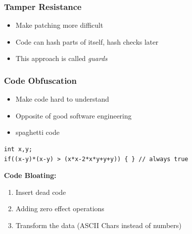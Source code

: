 \subsubsection{Tamper Resistance}
\begin{itemize}
    \item Make patching more difficult
    \item Code can hash parts of itself, hash checks later
    \item This approach is called \textit{guards}
\end{itemize}

\subsubsection{Code Obfuscation}
\begin{itemize}
    \item Make code hard to understand
    \item Opposite of good software engineering
    \item spaghetti code
\end{itemize}
\begin{lstlisting}
int x,y;
if((x-y)*(x-y) > (x*x-2*x*y+y+y)) { } // always true
\end{lstlisting}
\textbf{Code Bloating:}
\begin{enumerate}
    \item Insert dead code
    \item Adding zero effect operations
    \item Transform the data (ASCII Chars instead of numbers)
\end{enumerate}